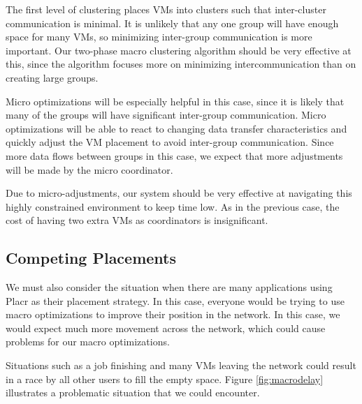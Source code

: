 \documentclass[11pt]{article}
\begin{document}
The first level of clustering places VMs into clusters such that inter-cluster communication is minimal.  It is unlikely that any one group will have enough space for many VMs, so minimizing inter-group communication is more important.  Our two-phase macro clustering algorithm should be very effective at this, since the algorithm focuses more on minimizing intercommunication than on creating large groups.

Micro optimizations will be especially helpful in this case, since it is likely that many of the groups will have significant inter-group communication.  Micro optimizations will be able to react to changing data transfer characteristics and quickly adjust the VM placement to avoid inter-group communication.  Since more data flows between groups in this case, we expect that more adjustments will be made by the micro coordinator.

Due to micro-adjustments, our system should be very effective at navigating this highly constrained environment to keep time low.  As in the previous case, the cost of having two extra VMs as coordinators is insignificant.


\subsection{Competing Placements}

We must also consider the situation when there are many applications using Placr as their placement strategy.  In this case, everyone would be trying to use macro optimizations to improve their position in the network.  In this case, we would expect much more movement across the network, which could cause problems for our macro optimizations.

Situations such as a job finishing and many VMs leaving the network could result in a race by all other users to fill the empty space.  Figure \ref{fig:macrodelay} illustrates a problematic situation that we could encounter.
\end{document}
